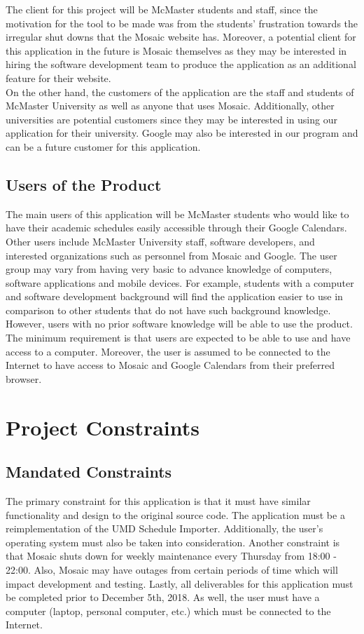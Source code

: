 \documentclass[12pt, titlepage]{article}
\begin{document}
\color{blue}
The client for this project will be McMaster students and staff, since the motivation for the tool to be made was from the students' frustration towards the irregular shut downs that the Mosaic website has. Moreover, a potential client for this application in the future is Mosaic themselves as they may be interested in hiring the software development team to produce the application as an additional feature for their website.\\


On the other hand, the customers of the application are the staff and students of McMaster University as well as anyone that uses Mosaic. Additionally, other universities are potential customers since they may be interested in using our application for their university. Google may also be interested in our program and can be a future customer for this application.
\color{black}
\subsection{Users of the Product}
\hspace{5mm}The main users of this application will be McMaster students who would like to have their academic schedules easily accessible through their Google Calendars.
\color{blue} Other users include McMaster University staff, software developers, and interested organizations such as personnel from Mosaic and Google.
\color{black}
The user group may vary from having very basic to advance knowledge of computers, software applications and mobile devices. \color{blue} For example, students with a computer and software development background will find the application easier to use in comparison to other students that do not have such background knowledge. However, users with  no prior software knowledge will be able to use the product. The minimum requirement is that users are expected to be able to use and have access to a computer. \color{black}
Moreover, the user is assumed to be connected to the Internet to have access to Mosaic and Google Calendars from their preferred browser. 

\section{Project Constraints}

\subsection{Mandated Constraints}
\hspace{5mm}The primary constraint for this application is that it must have similar functionality and design to the original source code. The application must be a reimplementation of the UMD Schedule Importer. Additionally, the user's operating system must also be taken into consideration. 
Another constraint is that Mosaic shuts down for weekly maintenance every Thursday from 18:00 - 22:00. Also, Mosaic may have outages from certain periods of time which will impact development and testing. Lastly, all deliverables for this application must be completed prior to December 5th, 2018.
\color{blue}
As well, the user must have a computer (laptop, personal computer, etc.) which must be connected to the Internet.
\color{black}
\end{document}
